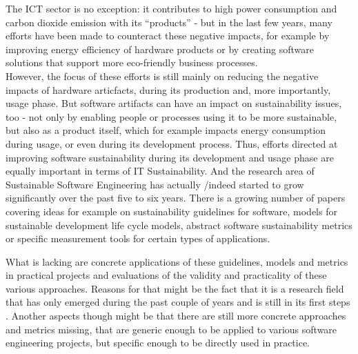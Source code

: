 The ICT sector is no exception: %
it contributes to high power consumption and carbon dioxide emission with its "`products"' %
- but in the last few years, many efforts have been made to counteract these negative impacts, for example by improving energy efficiency of hardware products or by creating software solutions that support more eco-friendly business processes.\\
However, the focus of these efforts is still mainly on reducing the negative impacts of hardware articfacts, %
 during its production and, more importantly, usage phase. But software artifacts can have an impact on sustainability issues, too - not only by enabling people or processes using it to be more sustainable, but also as a product itself, which for example impacts energy consumption during usage, or even during its development process. %
Thus, efforts directed at improving software sustainability during its development and usage phase are equally important in terms of IT Sustainability. And the research area of Sustainable Software Engineering has actually /indeed %
 started to grow %
significantly over the past five to six years. %
There is a growing number of papers %
covering ideas for example on sustainability guidelines for software, models for sustainable development life cycle models, abstract software sustainability metrics or specific measurement tools for certain types of applications. 

What is lacking %
are %
concrete applications of these guidelines, models and metrics in practical projects %
and evaluations of the validity and practicality of these various approaches.
Reasons for that might be the %
fact that it is a research field that has only emerged during the past couple of years and is still in its first steps %
. Another aspects though might be that there are still more concrete approaches and metrics missing, that are generic enough to be applied to various software engineering projects, but specific enough to be directly used in practice.


